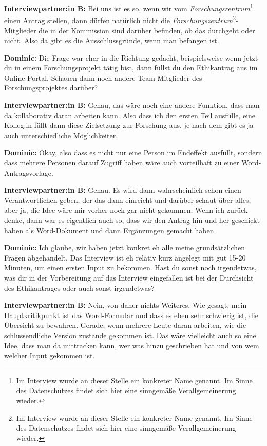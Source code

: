 \documentclass[a4paper,12pt,twoside]{scrreprt}
\begin{document}
\textbf{Interviewpartner:in B:} Bei uns ist es so, wenn wir vom \textit{Forschungszentrum}\footnote{Im Interview wurde an dieser Stelle ein konkreter Name genannt. Im Sinne des Datenschutzes findet sich hier eine sinngemäße Verallgemeinerung wieder.} einen Antrag stellen, dann dürfen natürlich nicht die \textit{Forschungszentrum}\footnote{Im Interview wurde an dieser Stelle ein konkreter Name genannt. Im Sinne des Datenschutzes findet sich hier eine sinngemäße Verallgemeinerung wieder.}-Mitglieder die in der Kommission sind darüber befinden, ob das durchgeht oder nicht. Also da gibt es die Ausschlussgründe, wenn man befangen ist.

\textbf{Dominic:} Die Frage war eher in die Richtung gedacht, beispielsweise wenn jetzt du in einem Forschungsprojekt tätig bist, dann füllst du den Ethikantrag aus im Online-Portal. Schauen dann noch andere Team-Mitglieder des Forschungsprojektes darüber?

\textbf{Interviewpartner:in B:} Genau, das wäre noch eine andere Funktion, dass man da kollaborativ daran arbeiten kann. Also dass ich den ersten Teil ausfülle, eine Kolleg:in füllt dann diese Zielsetzung zur Forschung aus, je nach dem gibt es ja auch unterschiedliche Möglichkeiten.

\textbf{Dominic:} Okay, also dass es nicht nur eine Person im Endeffekt ausfüllt, sondern dass mehrere Personen darauf Zugriff haben wäre auch vorteilhaft zu einer Word-Antragsvorlage.

\textbf{Interviewpartner:in B:} Genau. Es wird dann wahrscheinlich schon einen Verantwortlichen geben, der das dann einreicht und darüber schaut über alles, aber ja, die Idee wäre mir vorher noch gar nicht gekommen. Wenn ich zurück denke, dann war es eigentlich auch so, dass wir den Antrag hin und her geschickt haben als Word-Dokument und dann Ergänzungen gemacht haben.

\textbf{Dominic:} Ich glaube, wir haben jetzt konkret eh alle meine grundsätzlichen Fragen abgehandelt. Das Interview ist eh relativ kurz angelegt mit gut 15-20 Minuten, um einen ersten Input zu bekommen. Hast du sonst noch irgendetwas, was dir in der Vorbereitung auf das Interview eingefallen ist bei der Durchsicht des Ethikantrages oder auch sonst irgendetwas?

\textbf{Interviewpartner:in B:} Nein, von daher nichts Weiteres. Wie gesagt, mein Hauptkritikpunkt ist das Word-Formular und dass es eben sehr schwierig ist, die Übersicht zu bewahren. Gerade, wenn mehrere Leute daran arbeiten, wie die schlussendliche Version zustande gekommen ist. Das wäre vielleicht auch so eine Idee, dass man da mittracken kann, wer was hinzu geschrieben hat und von wem welcher Input gekommen ist.
\end{document}
